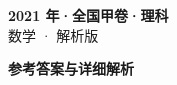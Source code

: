 \documentclass[zihao=-4, a4paper]{ctexart}
\begin{document}
\begin{center}
  {\Large\bfseries 2021 年·全国甲卷·理科}\\[4pt]
  {\large 数学 · 解析版}
\end{center}
\medskip
{}

\clearpage
{}
\begin{center}{\Large\bfseries 参考答案与详细解析}\end{center}
\medskip

\end{document}
